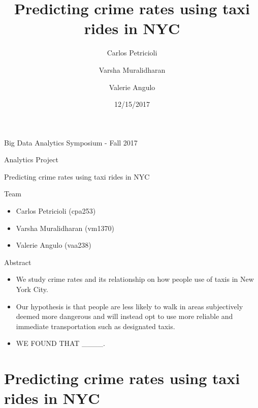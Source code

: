 \documentclass[10pt,ignorenonframetext,]{beamer}
\author{Carlos Petricioli \and
    Varsha Muralidharan   \and
    Valerie Angulo  }
\institute[New York University]{ New York University \\ \{cpa253,vm1370,vaa238\}@nyu.edu }
\title{Predicting crime rates using taxi rides in NYC}
\date{12/15/2017}
\providecommand{\tightlist}{%
  \setlength{\itemsep}{0pt}\setlength{\parskip}{0pt}}
\begin{document}
\frame{\titlepage}

\begin{frame}{%
\protect\hypertarget{big-data-analytics-symposium---fall-2017}{%
Big Data Analytics Symposium - Fall 2017}}

\begin{block}{Analytics Project}

Predicting crime rates using taxi rides in NYC

\end{block}

\begin{block}{Team}

\begin{itemize}
\item
  Carlos Petricioli (cpa253)
\item
  Varsha Muralidharan (vm1370)
\item
  Valerie Angulo (vaa238)
\end{itemize}

\end{block}

\begin{block}{Abstract}

\begin{itemize}
\tightlist
\item
  We study crime rates and its relationship on how people use of taxis
  in New York City.
\item
  Our hypothesis is that people are less likely to walk in areas
  subjectively deemed more dangerous and will instead opt to use more
  reliable and immediate transportation such as designated taxis.
\item
  WE FOUND THAT \_\_\_\_.
\end{itemize}

\end{block}

\end{frame}

\hypertarget{predicting-crime-rates-using-taxi-rides-in-nyc}{%
\section{Predicting crime rates using taxi rides in
NYC}\label{predicting-crime-rates-using-taxi-rides-in-nyc}}
\end{document}

